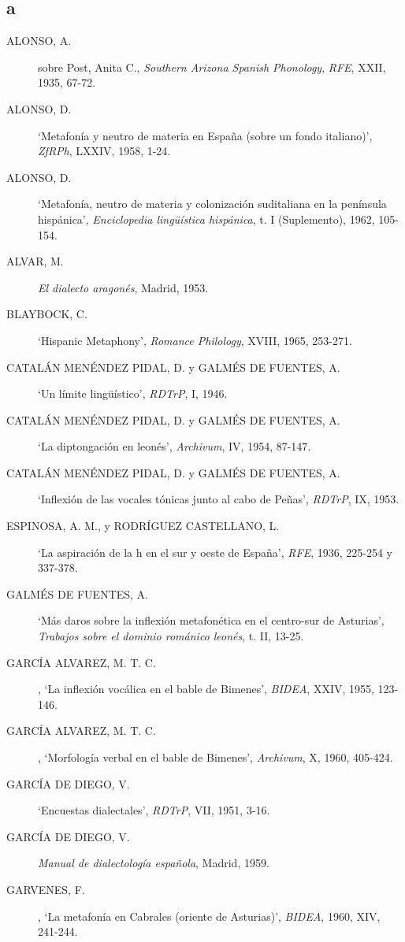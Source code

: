 \documentclass[11pt,spanish,b5paper]{book}
\begin{document}
\subsection{a} \begin{description}
\item[ALONSO, A.] sobre Post, Anita C., \textit{Southern Arizona Spanish Phonology}, \textit{RFE}, XXII, 1935, 67-72.
\item[ALONSO, D.] `Metafonía y neutro de materia en España (sobre un fondo italiano)', \textit{ZfRPh}, LXXIV, 1958, 1-24.
\item[ALONSO, D.]`Metafonía, neutro de materia y colonización suditaliana en la península hispánica', \textit{Enciclopedia lingüística hispánica}, t. I (Suplemento), 1962, 105-154.
\item[ALVAR, M.] \textit{El dialecto aragonés}, Madrid, 1953. 
\item[BLAYBOCK, C.] `Hispanic Metaphony',  \textit{Romance Philology}, XVIII, 1965, 253-271.
\item[CATALÁN MENÉNDEZ PIDAL, D. y GALMÉS DE FUENTES, A.] `Un límite lingüístico', \textit{RDTrP}, I, 1946. 
\item[CATALÁN MENÉNDEZ PIDAL, D. y GALMÉS DE FUENTES, A.] `La diptongación en leonés', \textit{Archivum}, IV, 1954, 87-147.
\item[CATALÁN MENÉNDEZ PIDAL, D. y GALMÉS DE FUENTES, A.] `Inflexión de las vocales tónicas junto al cabo de Peñas', \textit{RDTrP}, IX, 1953.
\item[ESPINOSA, A. M., y RODRÍGUEZ CASTELLANO, L.] `La aspiración de la h en el sur y oeste de España', \textit{RFE}, 1936, 225-254 y 337-378. 
\item[GALMÉS DE FUENTES, A.] `Más daros sobre la inflexión metafonética en el centro-sur de Asturias', \textit{Trabajos sobre el dominio románico leonés}, t. II, 13-25.
\item[GARCÍA ALVAREZ, M. T. C.], `La inflexión vocálica en el bable de Bimenes', \textit{BIDEA}, XXIV, 1955, 123-146.
\item[GARCÍA ALVAREZ, M. T. C.], `Morfología verbal en el bable de Bimenes', \textit{Archivum}, X, 1960, 405-424.
\item[GARCÍA DE DIEGO, V.] `Encuestas dialectales', \textit{RDTrP}, VII, 1951, 3-16. 
\item[GARCÍA DE DIEGO, V.] \textit{Manual de dialectología española}, Madrid, 1959.
\item[GARVENES, F.], `La metafonía en Cabrales (oriente de Asturias)', \textit{BIDEA}, 1960, XIV, 241-244.

\end{description}
\end{document}
